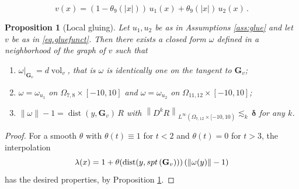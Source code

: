 \documentclass[10pt,a4paper]{amsart}
\newtheorem{proposition}{Proposition}
\newcommand{\R}{\mathbb{R}}
\newcommand{\bG}{\mathbf{G}} %
\DeclareMathOperator{\dist}{dist}
\newcommand{\norm}[1]{\left\lVert#1\right\rVert}
\begin{document}
\begin{equation}\label{eq.gluefunct}
v(x)=(1-\theta_9(|x|))\, u_1(x)+\theta_9(|x|)\, u_2(x)\,.
\end{equation}

\begin{proposition}[Local gluing]\label{prop:localglue}
    Let $u_1,u_2$ be as in Assumptions \ref{ass:glue} and let $v$ be as in \eqref{eq.gluefunct}. Then there exists a \emph{closed} form $\omega$ defined in a neighborhood of the graph of $v$ such that
    \begin{enumerate}[label=(F.\arabic*)]
    \item\label{prop:localglue-F1} $\omega|_{\bG_v}=d\operatorname{vol}_v$, that is $\omega$ is identically one on the tangent to $\bG_v$;
    \item\label{prop:localglue-F2} $\omega=\omega_{u_1}$ on $\Omega_{7,8}\times [-10,10]$ and $\omega=\omega_{u_2}$ on $\Omega_{11,12}\times [-10,10]$;
    \item\label{prop:localglue-F3} $\|\omega\|-1 = \dist(y,\bG_v)\,R$ with $\norm{D^k R}_{L^\infty(\Omega_{7,12}\times[-10,10)} \lesssim_k \,\boldsymbol{\delta}$ for any $k$.
    \end{enumerate}
\end{proposition}

\begin{proof}
    For a smooth $\theta$ with $\theta(t) \equiv 1$ for $t< 2$ and $\theta(t)=0$ for $t>3$, the interpolation
    \[ \lambda(x)=1+\theta(\dist(y,  {\rm spt}\, (\bG_v)))\left(\norm{\omega(y)}-1\right)\]
    has the desired properties, by Proposition \ref{prop:localglue}.
\end{proof}
\end{document}
